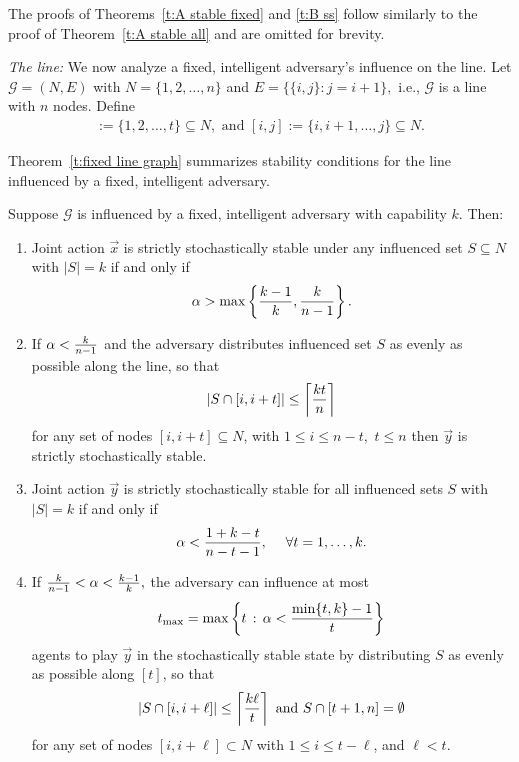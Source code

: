 The proofs of Theorems~\ref{t:A stable fixed} and \ref{t:B ss} follow similarly to the proof of Theorem~\ref{t:A stable all} and are omitted for brevity.


\noindent\emph{The line:} We now analyze a fixed, intelligent adversary's influence on the line. Let $\mathcal{G} = (N,E)$ with $N = \{1,2,\ldots,n\}$ and $E = \{\{i,j\}:j = i+1\},$ i.e., $\mathcal{G}$ is a line with $n$ nodes. Define 
\begin{align*}
[t] := \{1,2,\ldots,t\}\subseteq N, \text{ and }
[i,j] := \{i,i+1,\ldots,j\}\subseteq N.
\end{align*}


Theorem~\ref{t:fixed line graph} summarizes stability conditions for the line influenced by a fixed, intelligent adversary.

\begin{Theorem}\label{t:fixed line graph}%
Suppose $\mathcal{G}$ is influenced by a fixed, intelligent adversary with capability $k$. Then:
\begin{enumerate}%

\item Joint action $\vec{x}$ is strictly stochastically stable under any influenced set $S\subseteq N$ with $|S| = k$ if and only if
\begin{equation}
\alpha > \max\left\{{k-1\over k},{k\over n-1}\right\}.
\end{equation}


\item If $\alpha <{k\over n-1}$ and the adversary distributes influenced set $S$ as evenly as possible along the line, so that $$\left|S\cap [i,i+t]\right| \leq \left\lceil {kt\over n}\right\rceil$$ for any set of nodes $[i,i+t]\subseteq N$, with $1\leq i \leq n-t,$ $t\leq n$ 
then $\vec{y}$ is strictly stochastically stable.

\item Joint action $\vec{y}$ is strictly stochastically stable for all influenced sets $S$ with $|S| = k$ if and only if
\begin{equation}
\alpha < {1+k-t\over n-t-1},\;\quad\forall t = 1,\ldots,k.
\end{equation}

\item If ${k\over n-1}< \alpha < {k-1\over k},$ the adversary can influence at most
$$t_{\max} = \max\left\{t\,:\, \alpha < {\min\{t,k\}-1\over t}\right\}$$
agents to play $\vec{y}$ in the stochastically stable state by distributing $S$ as evenly as possible along $[t]$, so that
$$|S\cap [i,i+\ell]|\leq \left\lceil {k\ell\over t}\right\rceil \text{ and } S\cap[t+1,n] = \emptyset$$
for any set of nodes $[i,i+\ell]\subset N$ with $1\leq i\leq t-\ell$, and $\ell < t.$

\end{enumerate}

\end{Theorem}

